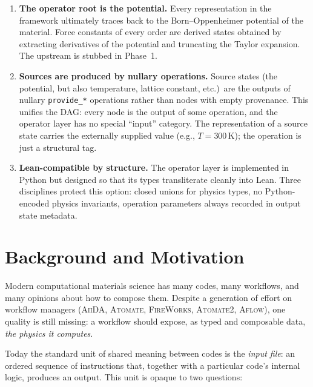 \documentclass[11pt,a4paper]{article}
\begin{document}
\begin{enumerate}[leftmargin=2.5em, itemsep=0.4em]
  \item \textbf{The operator root is the potential.} Every representation in the framework
        ultimately traces back to the Born--Oppenheimer potential of the material. Force
        constants of every order are derived states obtained by extracting derivatives of
        the potential and truncating the Taylor expansion. The upstream is stubbed in
        Phase~1.

  \item \textbf{Sources are produced by nullary operations.} Source states (the
        potential, but also temperature, lattice constant, etc.)\ are the outputs of
        nullary \texttt{provide\_*} operations rather than nodes with empty provenance.
        This unifies the DAG: every node is the output of some operation, and the
        operator layer has no special ``input'' category. The representation of a source
        state carries the externally supplied value (e.g., $T = 300\,\mathrm{K}$); the
        operation is just a structural tag.

  \item \textbf{Lean-compatible by structure.} The operator layer is implemented in Python
        but designed so that its types transliterate cleanly into Lean. Three disciplines
        protect this option: closed unions for physics types, no Python-encoded physics
        invariants, operation parameters always recorded in output state metadata.
       
\end{enumerate}

\bigskip


\section{Background and Motivation}
\label{sec:motivation}

Modern computational materials science has many codes, many workflows, and many opinions about how
to compose them. Despite a generation of effort on workflow managers (\textsc{AiiDA}, \textsc{Atomate},
\textsc{FireWorks}, \textsc{Atomate2}, \textsc{Aflow}), one quality is still missing: a workflow
should expose, as typed and composable data, \emph{the physics it computes}.

Today the standard unit of shared meaning between codes is the \emph{input file}: an ordered
sequence of instructions that, together with a particular code's internal logic, produces an
output. This unit is opaque to two questions:
\end{document}

